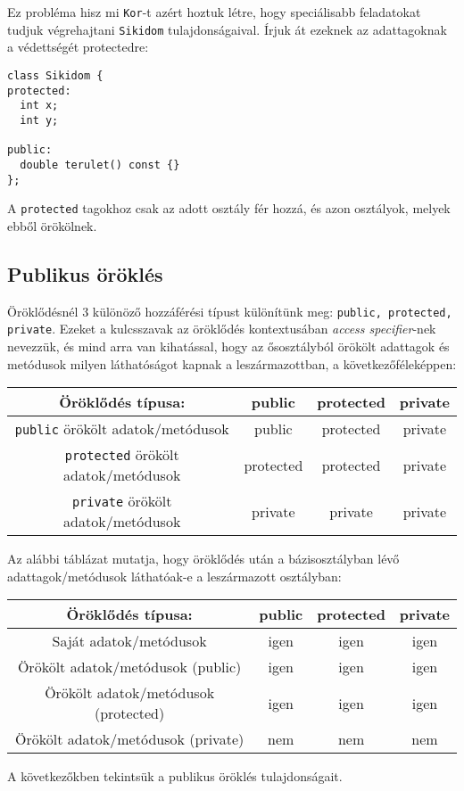 \documentclass[../cpp_book/cpp_book.tex]{subfiles}
\begin{document}
	Ez probléma hisz mi \texttt{Kor}-t azért hoztuk létre, hogy speciálisabb feladatokat tudjuk végrehajtani \texttt{Sikidom} tulajdonságaival. Írjuk át ezeknek az adattagoknak a védettségét protectedre:
	\begin{lstlisting}
class Sikidom {
protected:
  int x;
  int y;

public:
  double terulet() const {}
};
	\end{lstlisting}
	A \texttt{protected} tagokhoz csak az adott osztály fér hozzá, és azon osztályok, melyek ebből örökölnek.
	\subsection{Publikus öröklés}
	Öröklődésnél 3 különöző hozzáférési típust különítünk meg: \texttt{public, protected, private}. Ezeket a kulcsszavak az öröklődés kontextusában \textit{access specifier}-nek nevezzük, és mind arra van kihatással, hogy az ősosztályból örökölt adattagok és metódusok milyen láthatóságot kapnak a leszármazottban, a következőféleképpen:
	
	\begin{center}
		\begin{tabular}{|c||c|c|c|}
			\hline
			Öröklődés típusa:&public&protected&private\\
			\hline
			\hline
			\texttt{public} örökölt adatok/metódusok &\cellcolor{green!20}public&\cellcolor{orange!20}protected&\cellcolor{red!20}private\\
			\hline
			\texttt{protected} örökölt adatok/metódusok &\cellcolor{orange!20}protected&\cellcolor{orange!20}protected&\cellcolor{red!20}private\\
			\hline
			\texttt{private} örökölt adatok/metódusok &\cellcolor{red!20}private&\cellcolor{red!20}private&\cellcolor{red!20}private\\
			\hline
		\end{tabular}
	\end{center}
	Az alábbi táblázat mutatja, hogy öröklődés után a bázisosztályban lévő adattagok/metódusok láthatóak-e a leszármazott osztályban:
	\begin{center}
		\setlength{\extrarowheight}{2pt}
		\begin{tabular}{|c||c|c|c|}
			\hline
			Öröklődés típusa:&public&protected&private\\
			\hline
			\hline
			Saját adatok/metódusok& \cellcolor{green!20}igen&\cellcolor{green!20}igen&\cellcolor{green!20}igen\\
			\hline
			Örökölt adatok/metódusok (public)&\cellcolor{green!20}igen&\cellcolor{green!20}igen&\cellcolor{green!20}igen\\
			\hline
			Örökölt adatok/metódusok (protected)&\cellcolor{green!20}igen&\cellcolor{green!20}igen&\cellcolor{green!20}igen\\
			\hline
			Örökölt adatok/metódusok (private)&\cellcolor{red!20}nem&\cellcolor{red!20}nem&\cellcolor{red!20}nem\\
			\hline
		\end{tabular}
	\end{center}
	A következőkben tekintsük a publikus öröklés tulajdonságait.
	\medskip
	
\end{document}
